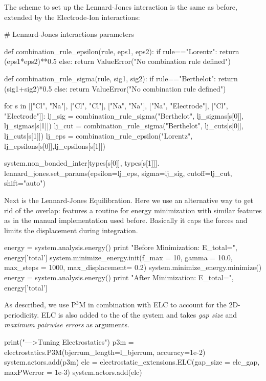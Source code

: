\documentclass[
a4paper,                        %
11pt,                           %
twoside,                        %
footsepline,                    %
headsepline,                    %
headexclude,                    %
footexclude,                    %
pagesize,                       %
]{scrartcl}
\begin{document}
The scheme to set up the Lennard-Jones interaction is the same as before, 
extended by the Electrode-Ion interactions:

\begin{pypresso}
# Lennard-Jones interactions parameters 

def combination_rule_epsilon(rule, eps1, eps2):
    if rule=="Lorentz":
        return (eps1*eps2)**0.5
    else:
        return ValueError("No combination rule defined")

def combination_rule_sigma(rule, sig1, sig2):
    if rule=="Berthelot":
        return (sig1+sig2)*0.5
    else:
        return ValueError("No combination rule defined")

for s in [["Cl", "Na"], ["Cl", "Cl"], ["Na", "Na"], ["Na", "Electrode"], ["Cl", "Electrode"]]:
        lj_sig = combination_rule_sigma("Berthelot", 
                lj_sigmas[s[0]], lj_sigmas[s[1]])
        lj_cut = combination_rule_sigma("Berthelot", 
                lj_cuts[s[0]], lj_cuts[s[1]])
        lj_eps = combination_rule_epsilon("Lorentz", 
                lj_epsilons[s[0]],lj_epsilons[s[1]])

        system.non_bonded_inter[types[s[0]], types[s[1]]].
            lennard_jones.set_params(epsilon=lj_eps, 
            sigma=lj_sig, cutoff=lj_cut, shift="auto")
\end{pypresso}

Next is the Lennard-Jones Equilibration. Here we use an alternative way to get rid of the overlap: \es features a routine for energy
minimization with similar features as in the manual implementation used before. Basically it 
caps the forces and limits the displacement during integration.

\begin{pypresso}
energy = system.analysis.energy()
print "Before Minimization: E_total=", energy['total']
system.minimize_energy.init(f_max = 10, gamma = 10.0, 
        max_steps = 1000, max_displacement= 0.2)
system.minimize_energy.minimize()
energy = system.analysis.energy()
print "After Minimization: E_total=", energy['total']
\end{pypresso}

As described, we use P$^3$M in combination with ELC to account for the 2D-periodicity. 
ELC is also added to the  of the system and takes \emph{gap size} and \emph{maximum
pairwise errors} as arguments.

\begin{pypresso}
print("\n--->Tuning Electrostatics")
p3m = electrostatics.P3M(bjerrum_length=l_bjerrum, 
        accuracy=1e-2)
system.actors.add(p3m)
elc = electrostatic_extensions.ELC(gap_size = elc_gap, 
        maxPWerror = 1e-3)
system.actors.add(elc)
\end{pypresso}
\end{document}
